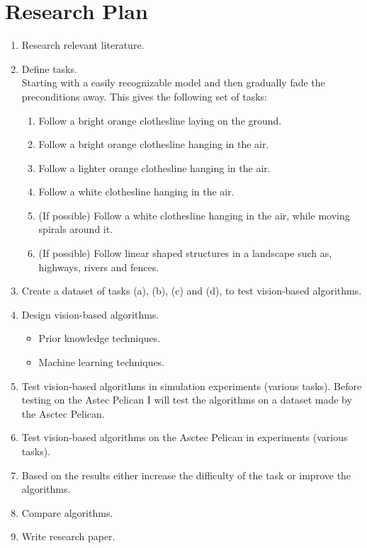\documentclass[11pt]{article}
\begin{document}
\section{Research Plan}
\begin{enumerate}
\item Research relevant literature.
\item Define tasks.\\
Starting with a easily recognizable model and then gradually fade the preconditions away. This gives the following set of tasks:
\begin{enumerate}
\item Follow a bright orange clothesline laying on the ground.
\item Follow a bright orange clothesline hanging in the air.
\item Follow a lighter orange clothesline hanging in the air.
\item Follow a white clothesline hanging in the air.
\item (If possible) Follow a white clothesline hanging in the air, while moving spirals around it.
\item (If possible) Follow linear shaped structures in a landscape such as, highways, rivers and fences.
\end{enumerate}
\item Create a dataset of tasks (a), (b), (c) and (d), to test vision-based algorithms.
\item Design vision-based algorithms.
\begin{itemize}
\item Prior knowledge techniques.
\item Machine learning techniques.
\end{itemize}
\item Test vision-based algorithms in simulation experiments (various tasks). Before testing on the Astec Pelican I will test the algorithms on a dataset made by the Asctec Pelican.
\item Test vision-based algorithms on the Asctec Pelican in experiments (various tasks).
\item Based on the results either increase the difficulty of the task or improve the algorithms.
\item Compare algorithms.
\item Write research paper.
\end{enumerate}
\end{document}
